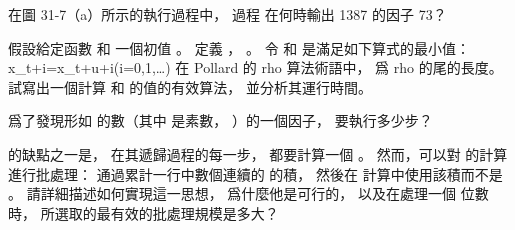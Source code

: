 \startsection[
  title={Integer factorization},
]

\startEXERCISE
在圖 31-7（a）所示的執行過程中，
過程  在何時輸出 1387 的因子 73？
\stopEXERCISE

\startANSWER
{}
\stopANSWER

\startEXERCISE
假設給定函數  和
一個初值 。
定義 ， 。
令  和  是滿足如下算式的最小值：
\startformula
x_{t+i}=x_{t+u+i}(i=0,1,\ldots)
\stopformula
在 Pollard 的 rho 算法術語中，
  爲 rho 的尾的長度。
試寫出一個計算  和  的值的有效算法，
並分析其運行時間。
\stopEXERCISE

\startANSWER
{}
\stopANSWER

\startEXERCISE
爲了發現形如  的數（其中  是素數， ）的一個因子，
  要執行多少步？
\stopEXERCISE

\startANSWER
{}
\stopANSWER

\startEXERCISE\DIFFICULT
{} 的缺點之一是，
在其遞歸過程的每一步，
都要計算一個 \m{\gcd}。
然而，可以對 \m{\gcd} 的計算進行批處理：
通過累計一行中數個連續的  的積，
然後在 \m{\gcd} 計算中使用該積而不是 。
請詳細描述如何實現這一思想，
爲什麼他是可行的，
以及在處理一個 \m{\beta} 位數  時，
所選取的最有效的批處理規模是多大？
\stopEXERCISE

\startANSWER
{}
\stopANSWER

\stopsection
